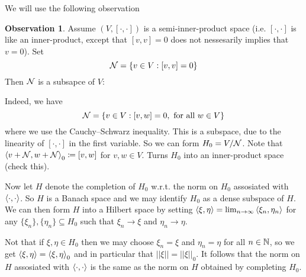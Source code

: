 \documentclass[10pt,english,a4paper]{article}
\theoremstyle{definition}
\newtheorem*{observation}{Observation}
\begin{document}
We will use the following observation
\begin{observation}
    Assume $(V,[\cdot,\cdot])$ is a semi-inner-product space 
(i.e. $[\cdot,\cdot]$ is like an inner-product, except that 
$[v,v] = 0$ does not nessesarily implies that $v=0$).
Set 
\[ \mathcal{N} = \{v \in V : [v,v] = 0\} \]
Then $\mathcal{N}$ is a subsapce of $V$:

Indeed, we have 
\[ \mathcal{N} = \{v \in V : [v,w] = 0, \text{ for all }w \in V\} \]
where we use the Cauchy–Schwarz inequality. This is a subspace, due to
the linearity of $[\cdot,\cdot]$ in the first variable.
So we can form $H_0 = V/\mathcal{N}$. Note that 
$\left\langle v +\mathcal{N}, w + \mathcal{N} \right\rangle_0 \coloneqq [v,w]$ for $v,w \in V$. 
Turns $H_0$ into an inner-product space (check this).

Now let $H$ denote the completion of $H_0$ w.r.t. the norm on $H_0$
assosiated with $\left\langle \cdot,\cdot \right\rangle$. So $H$ is a Banach space and we may 
identify $H_0$ as a dense subspace of $H$. We can 
then form $H$ into a Hilbert space by setting 
$\left\langle \xi,\eta \right\rangle = \lim_{n\to\infty} \left\langle \xi_n,\eta_n \right\rangle$ for 
any $\{\xi_n\}, \{\eta_n\}\subseteq H_0$ such that $\xi_n\to \xi$ and 
$\eta_n\to \eta$. 

Not that if $\xi,\eta\in H_0$ then we may choose $\xi_n=\xi$ and $\eta_n =\eta$ for all
$n\in\mathbb{N}$, so we get $\left\langle \xi,\eta \right\rangle = \left\langle \xi,\eta \right\rangle_{0}$ and in particular 
that $||\xi|| = ||\xi||_0$.
It follows that the norm on $H$ assosiated with $\left\langle \cdot,\cdot \right\rangle$ is the same 
as the norm on $H$ obtained by completing $H_0$.

\end{observation}
\end{document}
